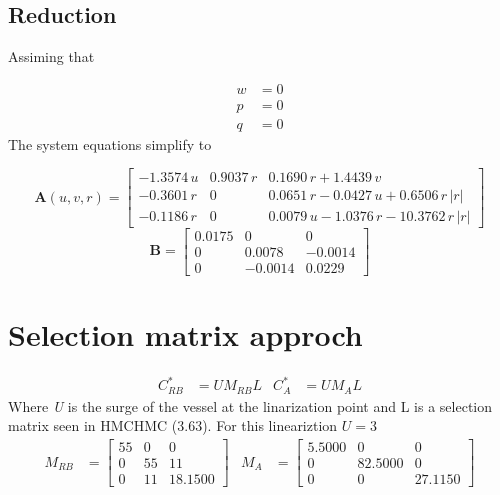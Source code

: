 \documentclass[12pt,a4]{article}
\begin{document}
\subsection{Reduction}

Assiming that

\begin{align*}
	w & = 0 \\
	p & = 0 \\
	q & = 0
\end{align*}
The system equations simplify to

\begin{equation}
	\bm{A}(u,v,r) = \left[\begin{array}{ccc} -1.3574\,u & 0.9037\,r & 0.1690\,r+1.4439\,v\\ -0.3601\,r & 0 & 0.0651\,r-0.0427\,u+0.6506\,r\,\left|r\right|\\ -0.1186\,r & 0 & 0.0079\,u-1.0376\,r-10.3762\,r\,\left|r\right| \end{array}\right]
\end{equation}
\begin{equation}
	\bm{B} = \left[\begin{array}{ccc} 0.0175 & 0 & 0\\ 0 & 0.0078 & -0.0014\\ 0 & -0.0014 & 0.0229 \end{array}\right]
\end{equation}


\section{Selection matrix approch}

\begin{align}
	C^*_{RB} & = UM_{RB}L
	         &
	C^*_{A}  & = UM_AL
\end{align}
Where \textit{U} is the surge of the vessel at the linarization point and L is a selection matrix seen in HMCHMC (3.63).
For this lineariztion $U=3$
\begin{align}
	M_{RB} & = \left[\begin{array}{ccc} 55 & 0 & 0\\ 0 & 55 & 11\\ 0 & 11 & 18.1500 \end{array}\right]
	       &
	M_{A}  & = \left[\begin{array}{ccc} 5.5000 & 0 & 0\\ 0 & 82.5000 & 0\\ 0 & 0 & 27.1150 \end{array}\right]
\end{align}
\end{document}
